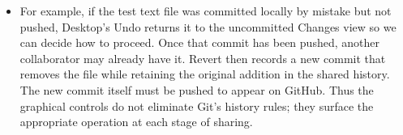 \documentclass[10pt]{article}
\begin{document}
\begin{itemize}[leftmargin=1.25em, itemsep=0.3em, parsep=0pt, topsep=0pt]
    \item For example, if the test text file was committed locally by mistake but not pushed, Desktop's Undo returns it to the uncommitted Changes view so we can decide how to proceed. Once that commit has been pushed, another collaborator may already have it. Revert then records a new commit that removes the file while retaining the original addition in the shared history. The new commit itself must be pushed to appear on GitHub. Thus the graphical controls do not eliminate Git's history rules; they surface the appropriate operation at each stage of sharing.
\end{itemize}
\end{document}
